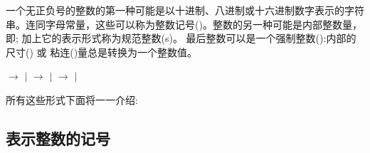 \documentclass{book}
\begin{document}
一个无正负号的整数的第一种可能是以十进制、八进制或十六进制数字表示的字符串。连同字母常量，这些可以称为整数记号()。整数的另一种可能是内部整数量，
即; 加上它的表示形式称为规范整数(s)。
最后整数可以是一个强制整数():内部的尺寸() 或 粘连()量总是转换为一个整数值。

\begin{disp} $\longrightarrow$ 
$|$ \nl
{} $\longrightarrow$ 
$|$ \nl
{} $\longrightarrow$ 
$|$ \end{disp}

所有这些形式下面将一一介绍:

\subsection{表示整数的记号}
\label{int:denotation}

\end{document}
